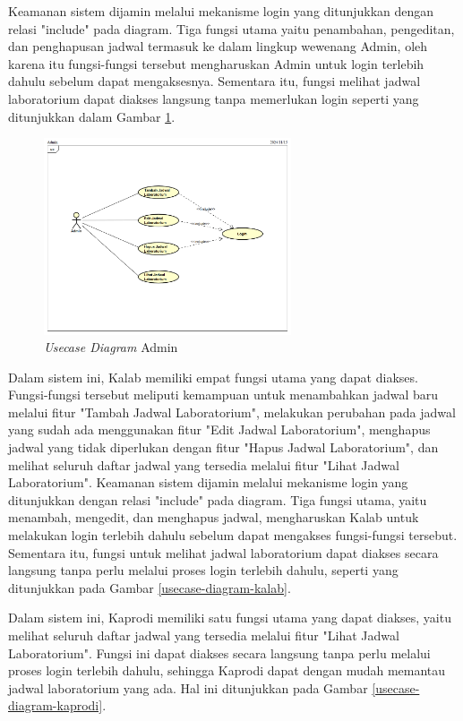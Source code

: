 Keamanan sistem dijamin melalui mekanisme login yang ditunjukkan dengan relasi "include" pada diagram. Tiga fungsi utama yaitu penambahan, pengeditan, dan penghapusan jadwal termasuk ke dalam lingkup wewenang Admin, oleh karena itu fungsi-fungsi tersebut mengharuskan Admin untuk login terlebih dahulu sebelum dapat mengaksesnya. Sementara itu, fungsi melihat jadwal laboratorium dapat diakses langsung tanpa memerlukan login seperti yang ditunjukkan dalam Gambar \ref{usecase-diagram-admin}.
\begin{figure}
	\centering
	\includegraphics[width=0.65\textwidth]{konten/gambar/usecase-diagram/admin.png}
	\caption{\textit{Usecase Diagram} Admin}
	\label{usecase-diagram-admin}
\end{figure}

Dalam sistem ini, Kalab memiliki empat fungsi utama yang dapat diakses. Fungsi-fungsi tersebut meliputi kemampuan untuk menambahkan jadwal baru melalui fitur "Tambah Jadwal Laboratorium", melakukan perubahan pada jadwal yang sudah ada menggunakan fitur "Edit Jadwal Laboratorium", menghapus jadwal yang tidak diperlukan dengan fitur "Hapus Jadwal Laboratorium", dan melihat seluruh daftar jadwal yang tersedia melalui fitur "Lihat Jadwal Laboratorium". Keamanan sistem dijamin melalui mekanisme login yang ditunjukkan dengan relasi "include" pada diagram. Tiga fungsi utama, yaitu menambah, mengedit, dan menghapus jadwal, mengharuskan Kalab untuk melakukan login terlebih dahulu sebelum dapat mengakses fungsi-fungsi tersebut. Sementara itu, fungsi untuk melihat jadwal laboratorium dapat diakses secara langsung tanpa perlu melalui proses login terlebih dahulu, seperti yang ditunjukkan pada Gambar \ref{usecase-diagram-kalab}.

Dalam sistem ini, Kaprodi memiliki satu fungsi utama yang dapat diakses, yaitu melihat seluruh daftar jadwal yang tersedia melalui fitur "Lihat Jadwal Laboratorium". Fungsi ini dapat diakses secara langsung tanpa perlu melalui proses login terlebih dahulu, sehingga Kaprodi dapat dengan mudah memantau jadwal laboratorium yang ada. Hal ini ditunjukkan pada Gambar \ref{usecase-diagram-kaprodi}.

